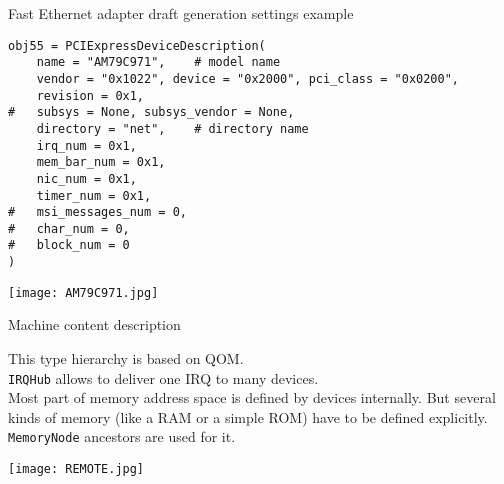 \documentclass[unicode,hyperref={unicode=true},aspectratio=169]{beamer}
\begin{document}
\begin{frame}[fragile]{Fast Ethernet adapter draft generation settings example}
\lstset{language=Python}
\begin{lstlisting}
obj55 = PCIExpressDeviceDescription(
    name = "AM79C971",    # model name
    vendor = "0x1022", device = "0x2000", pci_class = "0x0200",
    revision = 0x1,
#   subsys = None, subsys_vendor = None,
    directory = "net",    # directory name
    irq_num = 0x1,
    mem_bar_num = 0x1,
    nic_num = 0x1,
    timer_num = 0x1,
#   msi_messages_num = 0,
#   char_num = 0,
#   block_num = 0
)
\end{lstlisting}
\end{frame}

\begin{frame}
\begin{center}
\texttt{[image: AM79C971.jpg]}
\end{center}
\end{frame}



\begin{frame}[fragile]{Machine content description}

\begin{minipage}{0.61\textwidth}
\end{minipage}
\begin{minipage}{0.37\textwidth}
This type hierarchy is based on QOM. \\
\vfill
\texttt{IRQHub} allows to deliver one IRQ to many devices. \\
\vfill
Most part of memory address space is defined by devices internally.
But several kinds of memory (like a RAM or a simple ROM) have to be defined
explicitly.
\texttt{MemoryNode} ancestors are used for it. \\
\end{minipage}
\end{frame}



\begin{frame}
\begin{center}
\texttt{[image: REMOTE.jpg]}
\end{center}
\end{frame}
\end{document}
